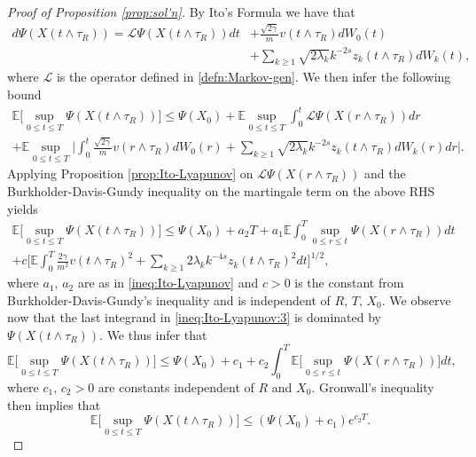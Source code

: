 \documentclass[11pt]{amsart}
\theoremstyle{definition}
\renewcommand{\L}{\mathcal{L}}
\newcommand{\mi}{\wedge}
\newcommand{\Enone}[1]{\mathbb{E}#1}
\theoremstyle{definition}
\theoremstyle{plain}
\numberwithin{equation}{section}
\begin{document}
\begin{proof}[Proof of Proposition \ref{prop:sol'n}]
By Ito's Formula we have that
\begin{equation}\label{eqn:Ito-Lyapunov:2}
\begin{aligned}
 d\Psi(X(t\mi\tau_R))=\mathcal{L}\Psi(X(t\mi\tau_R))dt & + \frac{\sqrt{2\gamma}}{m}v(t\mi\tau_R)dW_0(t)\\
 &+ \sum_{k\geq 1}\sqrt{2\lambda_k}k^{-2s}z_k(t\mi\tau_R)dW_k(t),
\end{aligned}
\end{equation}
where $\L$ is the operator defined in \eqref{defn:Markov-gen}. We then infer the following bound\begin{multline}\label{ineq:Ito-Lyapunov:2a}
\Enone\Big[\sup_{0\leq t\leq T} \Psi(X(t\wedge\tau_R)) \Big]
\leq \Psi(X_0)+\Enone\sup_{0\leq t\leq T} \int_0^t\!\!\L\Psi(X(r\wedge\tau_R))dr\\+\Enone\sup_{0\leq t\leq T}\Big|\int_0^t\!\! \frac{\sqrt{2\gamma}}{m}v(r\mi\tau_R)dW_0(r)+ \sum_{k\geq 1}\sqrt{2\lambda_k}k^{-2s}z_k(t\mi\tau_R)dW_k(r)dr \Big|.
\end{multline}
Applying Proposition \ref{prop:Ito-Lyapunov} on $\L\Psi(X(r\mi\tau_R))$ and the Burkholder-Davis-Gundy inequality on the martingale term on the above RHS yields
\begin{multline}\label{ineq:Ito-Lyapunov:3}
\Enone \Big[\sup_{0\leq t\leq T} \Psi(X(t\wedge\tau_R)) \Big]
\leq \Psi(X_0)+a_2T+a_1\Enone\int_0^T\!\sup_{0\leq r\leq t} \Psi(X(r\wedge\tau_R))dt\\+c\Big[\Enone\int_0^T\! \frac{2\gamma}{m^2}v(t\wedge\tau_R)^2
+\sum_{k\geq 1}2\lambda_k k^{-4s}z_k(t\wedge\tau_R)^2dt \Big]^{1/2},
\end{multline}
where $a_1,\, a_2$ are as in \eqref{ineq:Ito-Lyapunov} and $c>0$ is the constant from Burkholder-Davis-Gundy's inequality and is independent of $R,\, T,\, X_0$. We observe now that the last integrand in \eqref{ineq:Ito-Lyapunov:3} is dominated by $\Psi(X(t\wedge\tau_R))$. We thus infer that
\begin{equation}\label{ineq:Ito-Lyapunov:4}
\Enone \Big[\sup_{0\leq t\leq T} \Psi(X(t\wedge\tau_R))\Big]\leq \Psi(X_0)+c_1+ c_2\int_0^T\Enone\Big[\sup_{0\leq r\leq t} \Psi(X(r\wedge\tau_R))\Big]dt,
\end{equation}
where $c_1,\,c_2>0$ are constants independent of $R$ and $X_0$. Gronwall's inequality then implies that
\begin{equation}\label{ineq:Ito-Lyapunov:5}
\Enone \Big[\sup_{0\leq t\leq T} \Psi(X(t\wedge\tau_R)) \Big]\leq \left(\Psi(X_0)+c_1\right)e^{c_2 T}.
\end{equation}

\end{proof}
\end{document}

